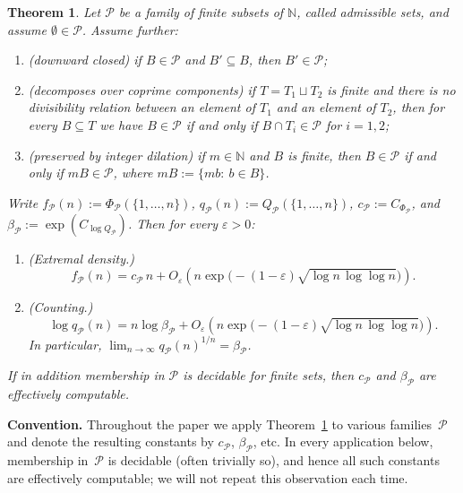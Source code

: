 \documentclass[11pt]{amsart}
\newtheorem{theorem}{Theorem}
\newcommand{\N}{\mathbb{N}}
\begin{document}
\begin{theorem}\label{thm:general}
Let \(\mathcal{P}\) be a family of finite subsets of \(\N\), called admissible sets, and assume \(\emptyset\in\mathcal{P}\). Assume further:
\begin{enumerate}
\item (downward closed) if \(B\in \mathcal{P}\) and \(B'\subseteq B\), then \(B'\in \mathcal{P}\);
\item (decomposes over coprime components) if \(T=T_1\sqcup T_2\) is finite and there is no divisibility relation between an element of \(T_1\) and an element of \(T_2\), then for every \(B\subseteq T\) we have \(B\in \mathcal{P}\) if and only if \(B\cap T_i\in \mathcal{P}\) for \(i=1,2\);
\item (preserved by integer dilation) if \(m\in \N\) and \(B\) is finite, then \(B\in \mathcal{P}\) if and only if \(mB\in \mathcal{P}\), where \(mB:=\{mb:\ b\in B\}\).
\end{enumerate}
Write \(f_{\mathcal{P}}(n):=\Phi_{\mathcal{P}}(\{1,\dots,n\})\), \(q_{\mathcal{P}}(n):=Q_{\mathcal{P}}(\{1,\dots,n\})\), \(c_{\mathcal{P}}:=C_{\Phi_{\mathcal{P}}}\), and \(\beta_{\mathcal{P}}:=\exp(C_{\log Q_{\mathcal{P}}})\).
Then for every \(\varepsilon>0\):
\begin{enumerate}[label=\textup{(\alph*)}]
\item \textup{(Extremal density.)}
\[
f_{\mathcal{P}}(n)=c_{\mathcal{P}}\,n+O_{\varepsilon}\!\left(
n\exp\!\bigl(-(1-\varepsilon)\sqrt{\log n\,\log\log n}\bigr)
\right).
\]

\item \textup{(Counting.)}
\[
\log q_{\mathcal{P}}(n)=n\log\beta_{\mathcal{P}}+O_{\varepsilon}\!\left(
n\exp\!\bigl(-(1-\varepsilon)\sqrt{\log n\,\log\log n}\bigr)
\right).
\]
In particular, \(\lim_{n\to\infty}q_{\mathcal{P}}(n)^{1/n}=\beta_{\mathcal{P}}\).
\end{enumerate}
If in addition membership in \(\mathcal{P}\) is decidable for finite sets, then \(c_{\mathcal{P}}\) and \(\beta_{\mathcal{P}}\) are effectively computable.
\end{theorem}

\noindent\textbf{Convention.} Throughout the paper we apply Theorem~\ref{thm:general} to various families~\(\mathcal{P}\) and denote the resulting constants by \(c_{\mathcal{P}}\), \(\beta_{\mathcal{P}}\), etc. In every application below, membership in~\(\mathcal{P}\) is decidable (often trivially so), and hence all such constants are effectively computable; we will not repeat this observation each time.
\end{document}
